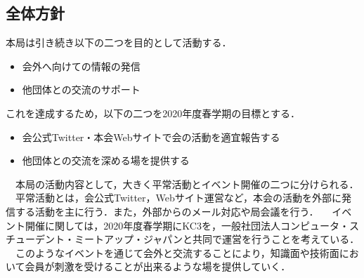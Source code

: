 \subsection*{全体方針}


本局は引き続き以下の二つを目的として活動する．
\begin{itemize}
    \item 会外へ向けての情報の発信
    \item 他団体との交流のサポート
\end{itemize}
これを達成するため，以下の二つを2020年度春学期の目標とする．
\begin{itemize}
    \item 会公式Twitter・本会Webサイトで会の活動を適宜報告する
    \item 他団体との交流を深める場を提供する
\end{itemize}
　本局の活動内容として，大きく平常活動とイベント開催の二つに分けられる．
　平常活動とは，会公式Twitter，Webサイト運営など，本会の活動を外部に発信する活動を主に行う．また，外部からのメール対応や局会議を行う．
　イベント開催に関しては，2020年度春学期にKC3を，一般社団法人コンピュータ・スチューデント・ミートアップ・ジャパンと共同で運営を行うことを考えている．
　このようなイベントを通じて会外と交流することにより，知識面や技術面において会員が刺激を受けることが出来るような場を提供していく．
